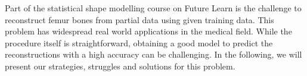 Part of the statistical shape modelling course on Future Learn is the challenge to reconstruct femur bones from partial data using given training data. This problem has widespread real world applications in the medical field. While the procedure itself is straightforward, obtaining a good model to predict the reconstructions with a high accuracy can be challenging. In the following, we will present our strategies, struggles and solutions for this problem.
